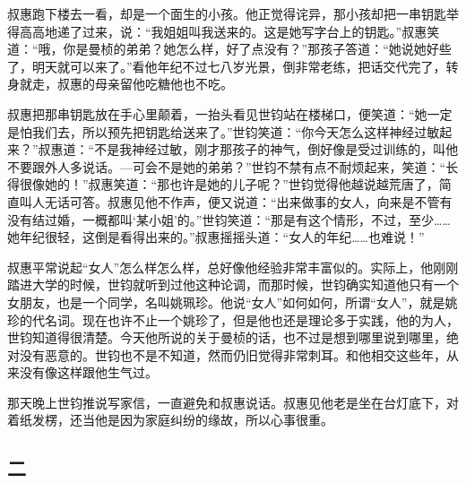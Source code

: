 \par 叔惠跑下楼去一看，却是一个面生的小孩。他正觉得诧异，那小孩却把一串钥匙举得高高地递了过来，说：“我姐姐叫我送来的。这是她写字台上的钥匙。”叔惠笑道：“哦，你是曼桢的弟弟？她怎么样，好了点没有？”那孩子答道：“她说她好些了，明天就可以来了。”看他年纪不过七八岁光景，倒非常老练，把话交代完了，转身就走，叔惠的母亲留他吃糖他也不吃。
\par 叔惠把那串钥匙放在手心里颠着，一抬头看见世钧站在楼梯口，便笑道：“她一定是怕我们去，所以预先把钥匙给送来了。”世钧笑道：“你今天怎么这样神经过敏起来？”叔惠道：“不是我神经过敏，刚才那孩子的神气，倒好像是受过训练的，叫他不要跟外人多说话。—可会不是她的弟弟？”世钧不禁有点不耐烦起来，笑道：“长得很像她的！”叔惠笑道：“那也许是她的儿子呢？”世钧觉得他越说越荒唐了，简直叫人无话可答。叔惠见他不作声，便又说道：“出来做事的女人，向来是不管有没有结过婚，一概都叫‘某小姐’的。”世钧笑道：“那是有这个情形，不过，至少……她年纪很轻，这倒是看得出来的。”叔惠摇摇头道：“女人的年纪……也难说！”
\par 叔惠平常说起“女人”怎么样怎么样，总好像他经验非常丰富似的。实际上，他刚刚踏进大学的时候，世钧就听到过他这种论调，而那时候，世钧确实知道他只有一个女朋友，也是一个同学，名叫姚珮珍。他说“女人”如何如何，所谓“女人”，就是姚珍的代名词。现在也许不止一个姚珍了，但是他也还是理论多于实践，他的为人，世钧知道得很清楚。今天他所说的关于曼桢的话，也不过是想到哪里说到哪里，绝对没有恶意的。世钧也不是不知道，然而仍旧觉得非常刺耳。和他相交这些年，从来没有像这样跟他生气过。
\par 那天晚上世钧推说写家信，一直避免和叔惠说话。叔惠见他老是坐在台灯底下，对着纸发楞，还当他是因为家庭纠纷的缘故，所以心事很重。

\subsection{二}

